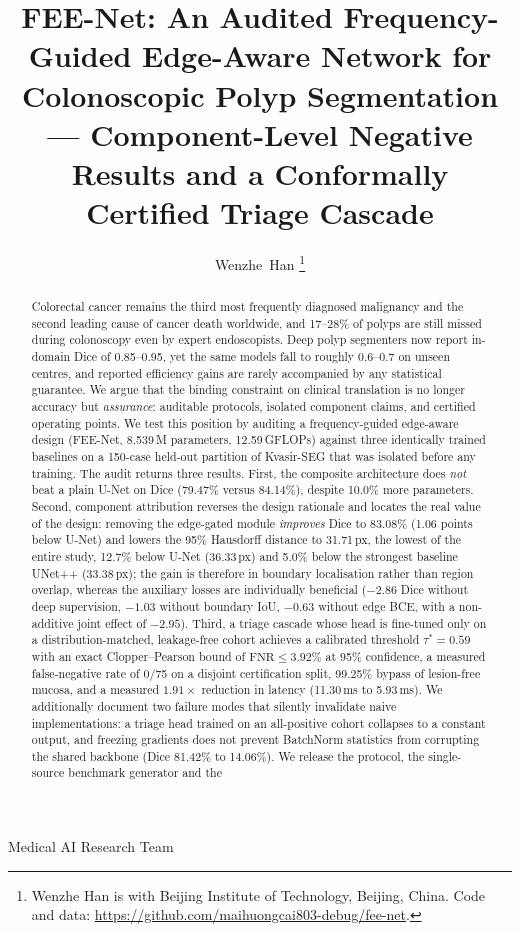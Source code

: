 \documentclass[journal]{IEEEtran}
\begin{document}
\title{FEE-Net: An Audited Frequency-Guided Edge-Aware Network for Colonoscopic Polyp Segmentation --- Component-Level Negative Results and a Conformally Certified Triage Cascade}

\author{Wenzhe~Han%
\thanks{Wenzhe Han is with Beijing Institute of Technology, Beijing, China. Code and data: \protect\url{https://github.com/maihuongcai803-debug/fee-net}.}}

%
{Medical AI Research Team}

\maketitle

\begin{abstract}
Colorectal cancer remains the third most frequently diagnosed malignancy and the second leading cause of cancer death worldwide, and 17--28\% of polyps are still missed during colonoscopy even by expert endoscopists. Deep polyp segmenters now report in-domain Dice of 0.85--0.95, yet the same models fall to roughly 0.6--0.7 on unseen centres, and reported efficiency gains are rarely accompanied by any statistical guarantee. We argue that the binding constraint on clinical translation is no longer accuracy but \emph{assurance}: auditable protocols, isolated component claims, and certified operating points. We test this position by auditing a frequency-guided edge-aware design (FEE-Net, 8.539\,M parameters, 12.59\,GFLOPs) against three identically trained baselines on a 150-case held-out partition of Kvasir-SEG that was isolated before any training. The audit returns three results. First, the composite architecture does \emph{not} beat a plain U-Net on Dice (79.47\% versus 84.14\%), despite 10.0\% more parameters. Second, component attribution reverses the design rationale and locates the real value of the design: removing the edge-gated module \emph{improves} Dice to 83.08\% (1.06 points below U-Net) and lowers the 95\% Hausdorff distance to 31.71\,px, the lowest of the entire study, 12.7\% below U-Net (36.33\,px) and 5.0\% below the strongest baseline UNet++ (33.38\,px); the gain is therefore in boundary localisation rather than region overlap, whereas the auxiliary losses are individually beneficial ($-2.86$ Dice without deep supervision, $-1.03$ without boundary IoU, $-0.63$ without edge BCE, with a non-additive joint effect of $-2.95$). Third, a triage cascade whose head is fine-tuned only on a distribution-matched, leakage-free cohort achieves a calibrated threshold $\tau^{*}=0.59$ with an exact Clopper--Pearson bound of $\mathrm{FNR}\le 3.92\%$ at 95\% confidence, a measured false-negative rate of 0/75 on a disjoint certification split, 99.25\% bypass of lesion-free mucosa, and a measured $1.91\times$ reduction in latency (11.30\,ms to 5.93\,ms). We additionally document two failure modes that silently invalidate naive implementations: a triage head trained on an all-positive cohort collapses to a constant output, and freezing gradients does not prevent BatchNorm statistics from corrupting the shared backbone (Dice 81.42\% to 14.06\%). We release the protocol, the single-source benchmark generator and the 
\end{abstract}
\end{document}
